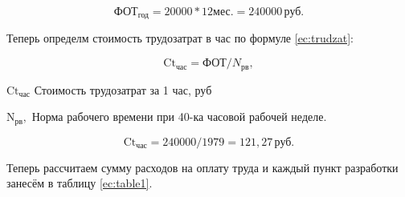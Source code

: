 \begin{equation*}
    \text{ФОТ}_\text{год} = 20 000 * 12 \text{мес.} = 240 000 \, \text{руб.}
\end{equation*}

Теперь определм стоимость трудозатрат в час по формуле \ref{ec:trudzat}:

\begin{equation}
    \label{ec:trudzat}
    \text{Ct}_\text{час} = \text{ФОТ} / N_\text{рв},
\end{equation}

\begin{eqexpl}[5ex]
    \item{$\text{Ct}_\text{час}$} Стоимость трудозатрат за 1 час, руб
    \item{$\text{N}_\text{рв},$} Норма рабочего времени при 40-ка часовой рабочей
неделе.
\end{eqexpl}

\begin{equation*}
    \text{Ct}_\text{час} = 240 000 / 1979 = 121,27 \, \text{руб}.
\end{equation*}

Теперь рассчитаем сумму расходов на оплату труда и каждый пункт
разработки занесём в таблицу \ref{ec:table1}.

